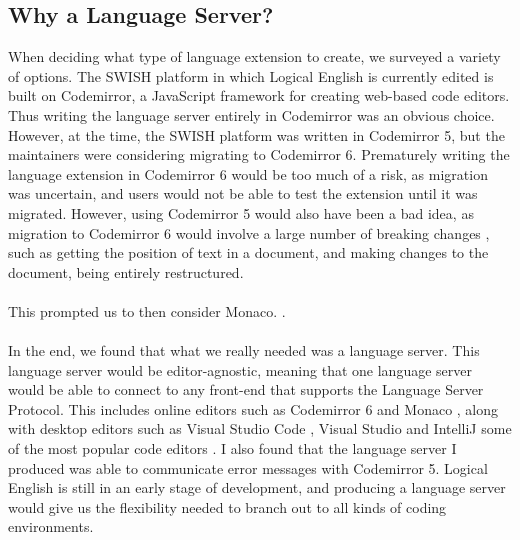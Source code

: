 \documentclass[../main.tex]{subfiles}
\begin{document}
\subsection{Why a Language Server?}
When deciding what type of language extension to create, we surveyed a variety of options. The SWISH platform in which Logical English is currently edited is built on Codemirror, a JavaScript framework for creating web-based code editors. Thus writing the language server entirely in Codemirror was an obvious choice. However, at the time, the SWISH platform was written in Codemirror 5, but the maintainers were considering migrating to Codemirror 6. Prematurely writing the language extension in Codemirror 6 would be too much of a risk, as migration was uncertain, and users would not be able to test the extension until it was migrated. However, using Codemirror 5 would also have been a bad idea, as migration to Codemirror 6 would involve a large number of breaking changes \cite{codemirror_migration}, such as getting the position of text in a document, and making changes to the document, being entirely restructured.
\\ 
\\ 
This prompted us to then consider Monaco. .
\\ \\ 
In the end, we found that what we really needed was a language server. This language server would be editor-agnostic, meaning that one language server would be able to connect to any front-end that supports the Language Server Protocol. This includes online editors such as Codemirror 6 \cite{codemirror_6_language_server} and Monaco \cite{monaco_language_server}, along with desktop editors such as Visual Studio Code \cite{vsc_langserver_docs}, Visual Studio \cite{visual_studio_language_server} and IntelliJ \cite{intellij_language_server} some of the most popular code editors \cite{ide_rankings}. I also found that the language server I produced was able to communicate error messages with Codemirror 5. Logical English is still in an early stage of development, and producing a language server would give us the flexibility needed to branch out to all kinds of coding environments.
\end{document}
